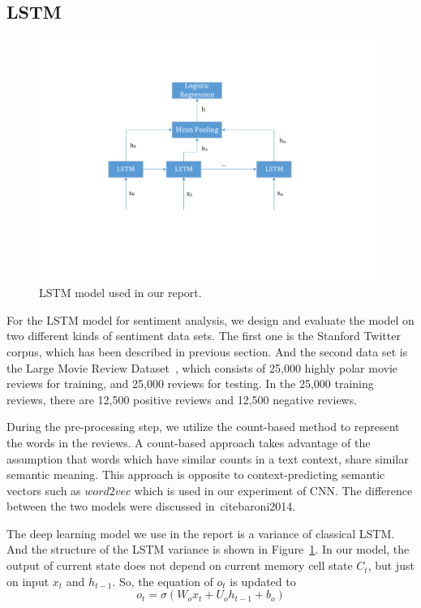 \subsection{LSTM}

\begin{figure}[tbp]
\centering
\includegraphics[scale=0.6]{figure/lstm_model.pdf}
\caption{LSTM model used in our report.}
\label{fig:lstm_model}
\end{figure}

For the LSTM model for sentiment analysis, we design and evaluate the model on two different kinds of sentiment data sets. The first one is the Stanford Twitter corpus, which has been described in previous section. And the second data set is the Large Movie Review Dataset~\cite{maas2011}, which consists of 25,000 highly polar movie reviews for training, and 25,000 reviews for testing. In the 25,000 training reviews, there are 12,500 positive reviews and 12,500 negative reviews.

During the pre-processing step, we utilize the count-based method to represent the words in the reviews. A count-based approach takes advantage of the assumption that words which have similar counts in a text context, share similar semantic meaning. This approach is opposite to context-predicting semantic vectors such as $word2vec$ which is used in our experiment of CNN. The difference between the two models were discussed in~cite{baroni2014}. 

The deep learning model we use in the report is a variance of classical LSTM. And the structure of the LSTM variance is shown in Figure~\ref{fig:lstm_model}. In our model, the output of current state does not depend on current memory cell state $C_t$, but just on input $x_t$ and $h_{t-1}$. So, the equation of $o_t$ is updated to
$$
o_t = \sigma (W_o x_t + U_o h_{t-1} + b_o)
$$

